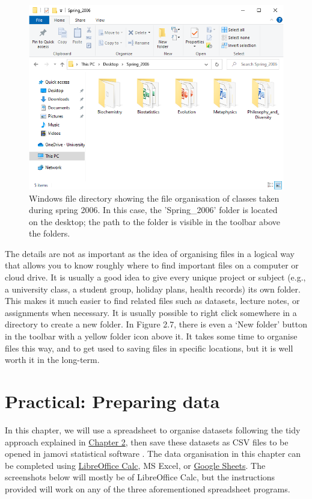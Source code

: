 \documentclass[
]{scrbook}
\begin{document}
\begin{figure}
\includegraphics[width=1\linewidth]{img/directory_windows} \caption{Windows file directory showing the file organisation of classes taken during spring 2006. In this case, the 'Spring\_2006' folder is located on the desktop; the path to the folder is visible in the toolbar above the folders.}\label{fig:unnamed-chunk-9}
\end{figure}

The details are not as important as the idea of organising files in a logical way that allows you to know roughly where to find important files on a computer or cloud drive.
It is usually a good idea to give every unique project or subject (e.g., a university class, a student group, holiday plans, health records) its own folder.
This makes it much easier to find related files such as datasets, lecture notes, or assignments when necessary.
It is usually possible to right click somewhere in a directory to create a new folder.
In Figure 2.7, there is even a `New folder' button in the toolbar with a yellow folder icon above it.
It takes some time to organise files this way, and to get used to saving files in specific locations, but it is well worth it in the long-term.

\hypertarget{Chapter_3}{%
\chapter{Practical: Preparing data}\label{Chapter_3}}

In this chapter, we will use a spreadsheet to organise datasets following the tidy approach explained in \protect\hyperlink{Chapter_2}{Chapter 2}, then save these datasets as CSV files to be opened in jamovi statistical software \citep{Jamovi2022}.
The data organisation in this chapter can be completed using \href{https://www.libreoffice.org/discover/calc/}{LibreOffice Calc}, MS Excel, or \href{https://docs.google.com/spreadsheets/}{Google Sheets}.
The screenshots below will mostly be of LibreOffice Calc, but the instructions provided will work on any of the three aforementioned spreadsheet programs.
\end{document}
